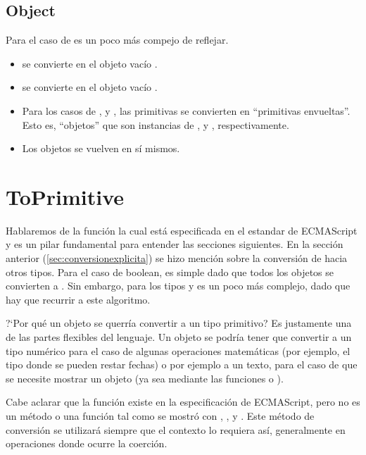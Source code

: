 \subsection{Object}

Para el caso de  es un poco más compejo de reflejar.

\begin{itemize}
\item {} se convierte en el objeto vacío \code{\{\}}.
\item {} se convierte en el objeto vacío \code{\{\}}.
\item Para los casos de ,  y , las primitivas se convierten en "`primitivas envueltas"'. Esto es, "`objetos"' que son instancias de ,  y , respectivamente.
\item Los objetos se vuelven en sí mismos.
\end{itemize}

\section{ToPrimitive}
\label{sec:toprimitive}

Hablaremos de la función  la cual está especificada en el estandar de ECMAScript y es un pilar fundamental para entender las secciones siguientes. En la sección anterior (\ref{sec:conversionexplicita}) se hizo mención sobre la conversión de  hacia otros tipos. Para el caso de boolean, es simple dado que todos los objetos se convierten a . Sin embargo, para los tipos  y  es un poco más complejo, dado que hay que recurrir a este algoritmo. 

?`Por qué un objeto se querría convertir a un tipo primitivo? Es justamente una de las partes flexibles del lenguaje. Un objeto se podría tener que convertir a un tipo numérico para el caso de algunas operaciones matemáticas (por ejemplo, el tipo  donde se pueden restar fechas) o por ejemplo a un texto, para el caso de que se necesite mostrar un objeto (ya sea mediante las funciones  o ).

Cabe aclarar que la función  existe en la especificación de ECMAScript, pero no es un método o una función tal como se mostró con , ,  y . Este método de conversión se utilizará siempre que el contexto lo requiera así, generalmente en operaciones donde ocurre la coerción.

